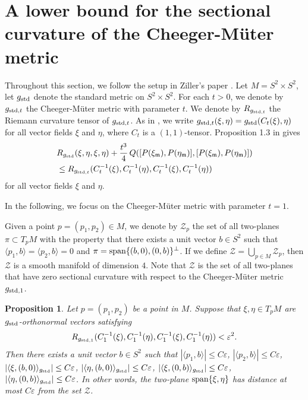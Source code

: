 \documentclass[11pt]{amsart}
\newtheorem{proposition}[theorem]{Proposition}
\theoremstyle{definition}
\begin{document}
\section{A lower bound for the sectional curvature of the Cheeger-M\"uter metric}

Throughout this section, we follow the setup in Ziller's paper \cite{Ziller}. Let $M = S^2 \times S^2$, let $g_{\text{\rm std}}$ denote the standard metric on $S^2 \times S^2$. For each $t > 0$, we denote by $g_{\text{\rm std},t}$ the Cheeger-M\"uter metric with parameter $t$. We denote by $R_{g_{\text{\rm std},t}}$ the Riemann curvature tensor of $g_{\text{\rm std},t}$. As in \cite{Ziller}, we write $g_{\text{\rm std},t}(\xi,\eta) = g_{\text{\rm std}}(C_t(\xi),\eta)$ for all vector fields $\xi$ and $\eta$, where $C_t$ is a $(1,1)$-tensor. Proposition 1.3 in \cite{Ziller} gives  
\begin{align*} 
&R_{g_{\text{\rm std}}}(\xi,\eta,\xi,\eta) + \frac{t^3}{4} \, Q([P(\xi_{\mathfrak{m}}),P(\eta_{\mathfrak{m}})],[P(\xi_{\mathfrak{m}}),P(\eta_{\mathfrak{m}})]) \\ 
&\leq R_{g_{\text{\rm std},t}}(C_t^{-1}(\xi),C_t^{-1}(\eta),C_t^{-1}(\xi),C_t^{-1}(\eta))
\end{align*}
for all vector fields $\xi$ and $\eta$. 

In the following, we focus on the Cheeger-M\"uter metric with parameter $t=1$.

Given a point $p = (p_1,p_2) \in M$, we denote by $\mathcal{Z}_p$ the set of all two-planes $\pi \subset T_p M$ with the property that there exists a unit vector $b \in S^2$ such that $\langle p_1,b \rangle = \langle p_2,b \rangle = 0$ and $\pi = \text{\rm span}\{(b,0),(0,b)\}^\perp$. If we define $\mathcal{Z} = \bigcup_{p \in M} \mathcal{Z}_p$, then $\mathcal{Z}$ is a smooth manifold of dimension $4$. Note that $\mathcal{Z}$ is the set of all two-planes that have zero sectional curvature with respect to the Cheeger-M\"uter metric $g_{\text{\rm std},1}$.

\begin{proposition} 
\label{lower.bound.for.sectional.curvature.of.Mueter.metrics}
Let $p = (p_1,p_2)$ be a point in $M$. Suppose that $\xi,\eta \in T_p M$ are $g_{\text{\rm std}}$-orthonormal vectors satisfying 
\[R_{g_{\text{\rm std},1}}(C_1^{-1}(\xi),C_1^{-1}(\eta),C_1^{-1}(\xi),C_1^{-1}(\eta)) < \varepsilon^2.\] 
Then there exists a unit vector $b \in S^2$ such that $|\langle p_1,b \rangle| \leq C\varepsilon$, $|\langle p_2,b \rangle| \leq C\varepsilon$, $|\langle \xi,(b,0) \rangle_{g_{\text{\rm std}}}| \leq C\varepsilon$, $|\langle \eta,(b,0) \rangle_{g_{\text{\rm std}}}| \leq C\varepsilon$, $|\langle \xi,(0,b) \rangle_{g_{\text{\rm std}}}| \leq C\varepsilon$,  $|\langle \eta,(0,b) \rangle_{g_{\text{\rm std}}}| \leq C\varepsilon$. In other words, the two-plane $\text{\rm span}\{\xi,\eta\}$ has distance at most $C\varepsilon$ from the set $\mathcal{Z}$.
\end{proposition}
\end{document}
